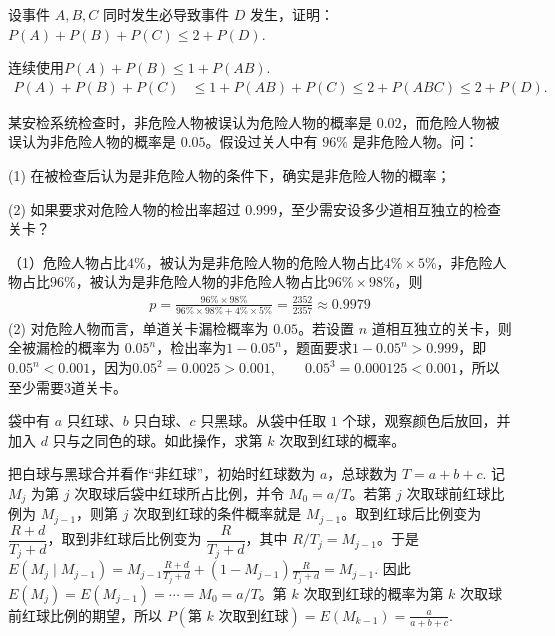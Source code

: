 \documentclass[lang=cn,11pt]{elegantbook}
\begin{document}
\begin{exercise}\label{exer:src-2008-probstat-2a-ix-01}\label{exer:src-paper3-proof-01}\label{prob:p3-proof-01}
设事件 \(A,B,C\) 同时发生必导致事件 \(D\) 发生，证明：
\(
P(A)+P(B)+P(C)\le 2+P(D).
\)
\end{exercise}
\begin{solution}
连续使用\(P(A)+P(B)\le1+P(AB).\)
\[
\begin{aligned}
P(A)+P(B)+P(C)
&\le 1+P(AB)+P(C)\le 2+P(ABC)\le 2+P(D).
\end{aligned}
\]
\end{solution}


\begin{exercise}\label{exer:src-2009-a-03}
某安检系统检查时，非危险人物被误认为危险人物的概率是 \(0.02\)，而危险人物被误认为非危险人物的概率是 \(0.05\)。假设过关人中有 \(96\%\) 是非危险人物。问：\par
(1) 在被检查后认为是非危险人物的条件下，确实是非危险人物的概率；\par
(2) 如果要求对危险人物的检出率超过 \(0.999\)，至少需安设多少道相互独立的检查关卡？
\end{exercise}
\begin{solution}
（1）危险人物占比$4\%$，被认为是非危险人物的危险人物占比$4\%\times 5\%$，非危险人物占比$96\%$，被认为是非危险人物的非危险人物占比$96\%\times 98\%$，则
\begin{align*}
p=\frac{96\%\times 98\%}{96\%\times 98\%+4\%\times 5\%}=\frac{2352}{2357}\approx 0.9979
\end{align*}
(2) 对危险人物而言，单道关卡漏检概率为 \(0.05\)。若设置 \(n\) 道相互独立的关卡，则全被漏检的概率为 \(0.05^n\)，检出率为\(1-0.05^n\)，题面要求\(1-0.05^n>0.999\)，即\(0.05^n<0.001\)，因为\(0.05^2=0.0025>0.001,\qquad 0.05^3=0.000125<0.001\)，所以至少需要3道关卡。
\end{solution}
\begin{exercise}\label{exer:src-2011-a-08-2credit-polya}
袋中有 \(a\) 只红球、\(b\) 只白球、\(c\) 只黑球。从袋中任取 \(1\) 个球，观察颜色后放回，并加入 \(d\) 只与之同色的球。如此操作，求第 \(k\) 次取到红球的概率。
\end{exercise}
\begin{solution}
把白球与黑球合并看作“非红球”，初始时红球数为 \(a\)，总球数为
\(
T=a+b+c.
\)
记 \(M_j\) 为第 \(j\) 次取球后袋中红球所占比例，并令 \(M_0=a/T\)。若第 \(j\) 次取球前红球比例为 \(M_{j-1}\)，则第 \(j\) 次取到红球的条件概率就是 \(M_{j-1}\)。取到红球后比例变为 \(\dfrac{R+d}{T_j+d}\)，取到非红球后比例变为 \(\dfrac{R}{T_j+d}\)，其中 \(R/T_j=M_{j-1}\)。于是
\(
E(M_j\mid M_{j-1})
=M_{j-1}\frac{R+d}{T_j+d}+(1-M_{j-1})\frac{R}{T_j+d}
=M_{j-1}.
\)
因此 \(E(M_{j})=E(M_{j-1})=\cdots=M_0=a/T\)。第 \(k\) 次取到红球的概率为第 \(k\) 次取球前红球比例的期望，所以
\(
P(\text{第 }k\text{ 次取到红球})=E(M_{k-1})=\frac{a}{a+b+c}.
\)
\end{solution}
\end{document}
